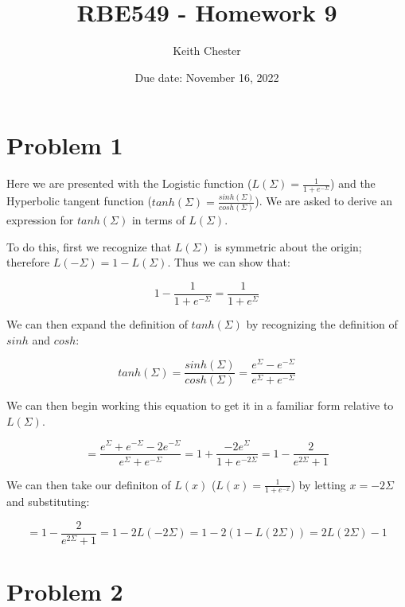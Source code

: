 \documentclass{article}
\title{RBE549 - Homework 9}
\author{Keith Chester}
\date{Due date: November 16, 2022}
\begin{document}
\maketitle

\section*{Problem 1}

Here we are presented with the Logistic function ($L(\Sigma) = \frac{1}{1+e^{-\Sigma}}$) and the Hyperbolic tangent function ($tanh(\Sigma) = \frac{sinh(\Sigma)}{cosh(\Sigma)}$). We are asked to derive an expression for $tanh(\Sigma)$ in terms of $L(\Sigma)$.

\noindent To do this, first we recognize that $L(\Sigma)$ is symmetric about the origin; therefore $L(-\Sigma) = 1 - L(\Sigma)$. Thus we can show that:

\begin{equation}
    1 - \frac{1}{1 + e^{-\Sigma}} = \frac{1}{1 + e^\Sigma}
\end{equation}

\noindent We can then expand the definition of $tanh(\Sigma)$ by recognizing the definition of $sinh$ and $cosh$:

\begin{equation}
    tanh(\Sigma) = \frac{sinh(\Sigma)}{cosh(\Sigma)} = \frac{e^\Sigma - e ^ {-\Sigma}}{e^\Sigma + e ^{-\Sigma}}
\end{equation}

\noindent We can then begin working this equation to get it in a familiar form relative to $L(\Sigma)$.

\begin{equation}
    = \frac{e^\Sigma + e^{-\Sigma} -2e^{-\Sigma}}{e^\Sigma + e^{-\Sigma}} = 1 + \frac{-2e^\Sigma}{1+ e^{-2\Sigma}} = 1 - \frac{2}{e^{2\Sigma} + 1}
\end{equation}

\noindent We can then take our definiton of $L(x)$ ($L(x) = \frac{1}{1 + e^{-x}}$) by letting $x=-2\Sigma$ and substituting:

\begin{equation}
    = 1 - \frac{2}{e^{2\Sigma} + 1} = 1 - 2L(-2\Sigma) = 1 - 2(1 - L(2\Sigma)) = 2L(2\Sigma) - 1
\end{equation}

\section*{Problem 2}
\end{document}
